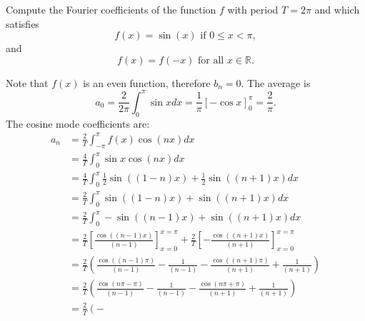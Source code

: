 \documentclass[11pt]{article}
\begin{document}
\begin{exercise}
    Compute the Fourier coefficients of the function $f$ with period $T = 2\pi$ and which satisfies 
     \[
        f(x) = \sin(x) \text{ if } 0 \leq x  < \pi,
     \]
     and 
     \[
        f(x) = f(-x) \text{ for all } x \in \mathbb R.
     \]
\end{exercise}
\begin{solution}     
    Note that $f(x)$ is an even function,
    therefore $b_n = 0$. 
    The average is 
	\[
        a_0 = \frac{2}{2\pi} \int_{0}^{\pi} \sin x dx  =  \frac{1}{\pi}\left[ - \cos{x} \right]_{0}^{\pi} =\frac{2}{\pi} .
    \]
    The cosine mode coefficients are:
    \begin{align*}
            a_n 
            &
            = 
            \frac{2}{T}
            \int_{-\pi}^{\pi} f(x)   \cos(n x) dx
            \\&
            = 
            \frac{4}{T}
            \int_{0}^{\pi} \sin x \cos(n x) dx
            \\&
            =
            \frac{4}{T}
            \int_{0}^{\pi} \frac 1 2 \sin((1-n)x) + \frac 1 2 \sin((n+1)x) dx
            \\&
            =
            \frac{2}{T}
            \int_{0}^{\pi} \sin((1-n)x) + \sin((n+1)x) dx
            \\&
            =
            \frac{2}{T}
            \int_{0}^{\pi} -\sin((n-1)x) + \sin((n+1)x) dx
            \\&
            =
            \frac{2}{T}
            \left[\frac{ \cos((n-1)x) }{ (n-1) } \right]_{x=0}^{x=\pi}
            +
            \frac{2}{T}
            \left[- \frac{ \cos((n+1)x) }{ (n+1) } \right]_{x=0}^{x=\pi}
            \\&
            = 
            \frac 2 T 
            \left( 
                \frac{ \cos((n-1)\pi) }{(n-1)} 
                - 
                \frac{1}{(n-1)}
                -
                \frac{ \cos((n+1)\pi) }{(n+1)} 
                + 
                \frac{1}{(n+1)}
            \right)
            \\&
            = 
            \frac 2 T 
            \left( 
                \frac{ \cos( n \pi - \pi ) }{(n-1)} 
                - 
                \frac{1}{(n-1)}
                -
                \frac{ \cos( n \pi + \pi ) }{(n+1)} 
                + 
                \frac{1}{(n+1)}
            \right)
            \\&
            = 
            \frac 2 T 
            \left( 
                -

\end{align*}
\end{solution}
\end{document}
